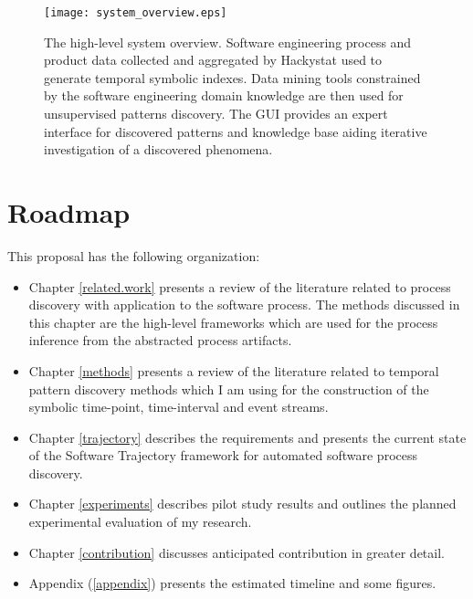 \begin{figure}[tbp]
   \centering
   \texttt{[image: system\_overview.eps]}
   \caption{The high-level system overview. Software engineering process and product data collected and aggregated by Hackystat used to generate temporal symbolic indexes. Data mining tools constrained by the software engineering domain knowledge are then used for unsupervised patterns discovery. The GUI provides an expert interface for discovered patterns and knowledge base aiding iterative investigation of a discovered phenomena.}
   \label{fig:system_overview}
\end{figure}

\section{Roadmap}
This proposal has the following organization:
\begin{itemize}
	\item Chapter \ref{related.work} presents a review of the literature related to process discovery with application to the software process. The methods discussed in this chapter are the high-level frameworks which are used for the process inference from the abstracted process artifacts.
	\item Chapter \ref{methods} presents a review of the literature related to temporal pattern discovery methods which I am using for the construction of the symbolic time-point, time-interval and event streams.
	\item Chapter \ref{trajectory} describes the requirements and presents the current state of the Software Trajectory framework for automated software process discovery.
	\item Chapter \ref{experiments} describes pilot study results and outlines the planned experimental evaluation of my research.
	\item Chapter \ref{contribution} discusses anticipated contribution in greater detail.
	\item Appendix (\ref{appendix}) presents the estimated timeline and some figures.
\end{itemize}
